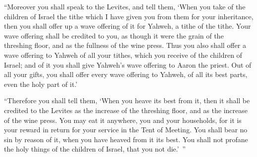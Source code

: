{“Moreover you shall speak to the Levites, and tell them, ‘When you take of the children of Israel the tithe which I have given you from them for your inheritance, then you shall offer up a wave offering of it for Yahweh, a tithe of the tithe.
Your wave offering shall be credited to you, as though it were the grain of the threshing floor, and as the fullness of the wine press.
Thus you also shall offer a wave offering to Yahweh of all your tithes, which you receive of the children of Israel; and of it you shall give Yahweh’s wave offering to Aaron the priest.
Out of all your gifts, you shall offer every wave offering to Yahweh, of all its best parts, even the holy part of it.’
\par }{\PP {}“Therefore you shall tell them, ‘When you heave its best from it, then it shall be credited to the Levites as the increase of the threshing floor, and as the increase of the wine press.
You may eat it anywhere, you and your households, for it is your reward in return for your service in the Tent of Meeting.
You shall bear no sin by reason of it, when you have heaved from it its best. You shall not profane the holy things of the children of Israel, that you not die.’ ”

}
